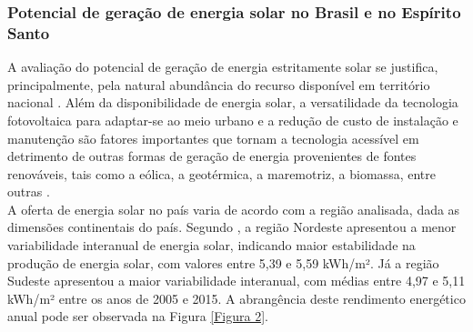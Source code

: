 \begin{onehalfspace}
    \subsubsection{Potencial de geração de energia solar no Brasil e no Espírito Santo}
A avaliação do potencial de geração de energia estritamente solar se justifica, principalmente, pela natural abundância do recurso disponível em território nacional \cite{Pereira2017}. Além da disponibilidade de energia solar, a versatilidade da tecnologia fotovoltaica para adaptar-se ao meio urbano e a redução de custo de instalação e manutenção são fatores importantes que tornam a tecnologia acessível em detrimento de outras formas de geração de energia provenientes de fontes renováveis, tais como a eólica, a geotérmica, a maremotriz, a biomassa, entre outras \cite{AgenciadeRegulacaodeServicosPublicosdoEspiritoSanto-ARSP2019,Didone2014,Didone2014a,InternationalEnergyAgency-IEA2019b,UnitedNationsEnvironmentProgramme-UNEP2019}.\vspace{0.3cm} \\
A oferta de energia solar no país varia de acordo com a região analisada, dada as dimensões continentais do país. Segundo \textcite{Pereira2017}, a região Nordeste apresentou a menor variabilidade interanual de energia solar, indicando maior estabilidade na produção de energia solar, com valores entre 5,39 e 5,59 kWh/m². Já a região Sudeste apresentou a maior variabilidade interanual, com médias entre 4,97 e 5,11 kWh/m² entre os anos de 2005 e 2015. A abrangência deste rendimento energético anual pode ser observada na Figura \ref{Figura 2}.\pagebreak
    

\end{onehalfspace}
